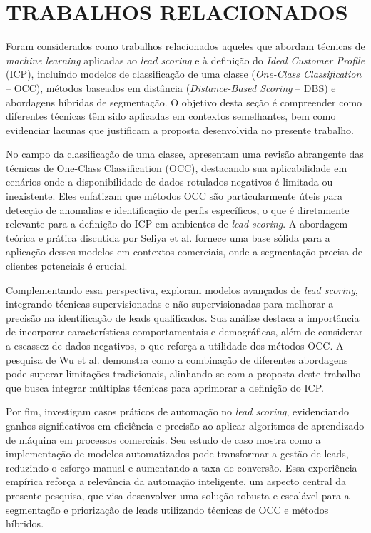 \chapter{TRABALHOS RELACIONADOS}

Foram considerados como trabalhos relacionados aqueles que abordam técnicas de \textit{machine learning} aplicadas ao \textit{lead scoring} e à definição do \textit{Ideal Customer Profile} (ICP), incluindo modelos de classificação de uma classe (\textit{One-Class Classification} – OCC), métodos baseados em distância (\textit{Distance-Based Scoring} – DBS) e abordagens híbridas de segmentação. O objetivo desta seção é compreender como diferentes técnicas têm sido aplicadas em contextos semelhantes, bem como evidenciar lacunas que justificam a proposta desenvolvida no presente trabalho.


No campo da classificação de uma classe, \citet{Seliya2021} apresentam uma revisão abrangente das técnicas de One-Class Classification (OCC), destacando sua aplicabilidade em cenários onde a disponibilidade de dados rotulados negativos é limitada ou inexistente. Eles enfatizam que métodos OCC são particularmente úteis para detecção de anomalias e identificação de perfis específicos, o que é diretamente relevante para a definição do ICP em ambientes de \textit{lead scoring}. A abordagem teórica e prática discutida por Seliya et al. fornece uma base sólida para a aplicação desses modelos em contextos comerciais, onde a segmentação precisa de clientes potenciais é crucial.

Complementando essa perspectiva, \citet{Wu2023} exploram modelos avançados de \textit{lead scoring}, integrando técnicas supervisionadas e não supervisionadas para melhorar a precisão na identificação de leads qualificados. Sua análise destaca a importância de incorporar características comportamentais e demográficas, além de considerar a escassez de dados negativos, o que reforça a utilidade dos métodos OCC. A pesquisa de Wu et al. demonstra como a combinação de diferentes abordagens pode superar limitações tradicionais, alinhando-se com a proposta deste trabalho que busca integrar múltiplas técnicas para aprimorar a definição do ICP.

Por fim, \citet{Nygard2020} investigam casos práticos de automação no \textit{lead scoring}, evidenciando ganhos significativos em eficiência e precisão ao aplicar algoritmos de aprendizado de máquina em processos comerciais. Seu estudo de caso mostra como a implementação de modelos automatizados pode transformar a gestão de leads, reduzindo o esforço manual e aumentando a taxa de conversão. Essa experiência empírica reforça a relevância da automação inteligente, um aspecto central da presente pesquisa, que visa desenvolver uma solução robusta e escalável para a segmentação e priorização de leads utilizando técnicas de OCC e métodos híbridos.

